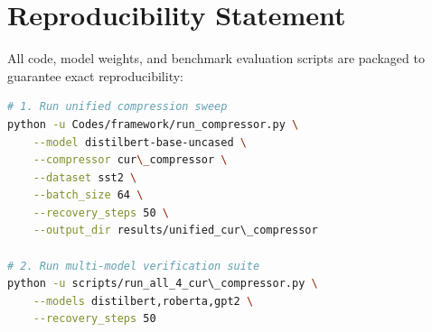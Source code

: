 \section{Reproducibility Statement}
All code, model weights, and benchmark evaluation scripts are packaged to guarantee exact reproducibility:
\begin{lstlisting}[language=bash]
# 1. Run unified compression sweep
python -u Codes/framework/run_compressor.py \
    --model distilbert-base-uncased \
    --compressor cur\_compressor \
    --dataset sst2 \
    --batch_size 64 \
    --recovery_steps 50 \
    --output_dir results/unified_cur\_compressor

# 2. Run multi-model verification suite
python -u scripts/run_all_4_cur\_compressor.py \
    --models distilbert,roberta,gpt2 \
    --recovery_steps 50
\end{lstlisting}
